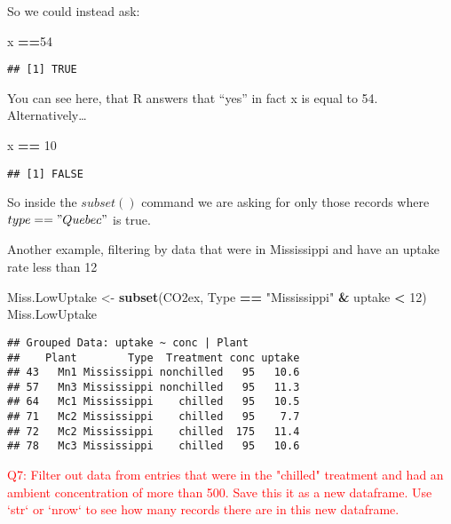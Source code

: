 \documentclass[]{article}
\newenvironment{Shaded}{\begin{snugshade}}{\end{snugshade}}
\newcommand{\DecValTok}[1]{\textcolor[rgb]{0.00,0.00,0.81}{#1}}
\newcommand{\KeywordTok}[1]{\textcolor[rgb]{0.13,0.29,0.53}{\textbf{#1}}}
\newcommand{\NormalTok}[1]{#1}
\newcommand{\OperatorTok}[1]{\textcolor[rgb]{0.81,0.36,0.00}{\textbf{#1}}}
\newcommand{\StringTok}[1]{\textcolor[rgb]{0.31,0.60,0.02}{#1}}
\begin{document}
So we could instead ask:

\begin{Shaded}
\begin{Highlighting}[]
\NormalTok{x }\OperatorTok{==}\DecValTok{54}
\end{Highlighting}
\end{Shaded}

\begin{verbatim}
## [1] TRUE
\end{verbatim}

You can see here, that R answers that ``yes'' in fact x is equal to 54.
Alternatively\ldots{}

\begin{Shaded}
\begin{Highlighting}[]
\NormalTok{x }\OperatorTok{==}\StringTok{ }\DecValTok{10}
\end{Highlighting}
\end{Shaded}

\begin{verbatim}
## [1] FALSE
\end{verbatim}

So inside the \(subset()\) command we are asking for only those records
where \(type=="Quebec"\) is true.

Another example, filtering by data that were in Mississippi and have an
uptake rate less than 12

\begin{Shaded}
\begin{Highlighting}[]
\NormalTok{Miss.LowUptake <-}\StringTok{ }\KeywordTok{subset}\NormalTok{(CO2ex, Type }\OperatorTok{==}\StringTok{ "Mississippi"} \OperatorTok{&}\StringTok{ }\NormalTok{uptake }\OperatorTok{<}\StringTok{ }\DecValTok{12}\NormalTok{)}
\NormalTok{Miss.LowUptake}
\end{Highlighting}
\end{Shaded}

\begin{verbatim}
## Grouped Data: uptake ~ conc | Plant
##    Plant        Type  Treatment conc uptake
## 43   Mn1 Mississippi nonchilled   95   10.6
## 57   Mn3 Mississippi nonchilled   95   11.3
## 64   Mc1 Mississippi    chilled   95   10.5
## 71   Mc2 Mississippi    chilled   95    7.7
## 72   Mc2 Mississippi    chilled  175   11.4
## 78   Mc3 Mississippi    chilled   95   10.6
\end{verbatim}

\textcolor{red}{Q7: Filter out data from entries that were in the "chilled" treatment and had an ambient concentration of more than 500. Save this it as a new dataframe. Use `str` or `nrow` to see how many records there are in this new dataframe.}
\end{document}
